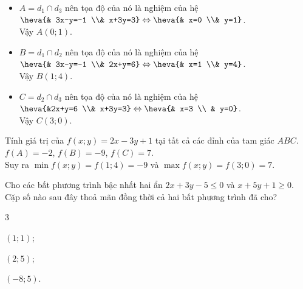\begin{bt}
{	\begin{itemize}
		\item $A=d_1\cap d_3$ nên tọa độ của nó là nghiệm của hệ $\heva{& 3x-y=-1 \\& x+3y=3}\Leftrightarrow \heva{& x=0 \\& y=1}$. \\
		Vậy $A(0;1)$.
		\item $B=d_1\cap d_2$ nên tọa độ của nó là nghiệm của hệ $\heva{& 3x-y=-1 \\& 2x+y=6}\Leftrightarrow \heva{& x=1 \\& y=4}$. \\
		Vậy $B(1;4)$.
		\item $C=d_2\cap d_3$ nên tọa độ của nó là nghiệm của hệ $\heva{&2x+y=6 \\& x+3y=3}\Leftrightarrow \heva{& x=3 \\ & y=0}$. \\
		Vậy $C(3;0)$.
	\end{itemize}
	Tính giá trị của $f(x;y)=2x-3y+1$ tại tất cả các đỉnh của tam giác $ABC$.\\
	$f(A)=-2$, $f(B)=-9$, $f(C)=7$.\\
	Suy ra $\min f( x;y )=f( 1;4 )=-9$ và $\max f( x;y )=f( 3;0 )=7$.
}
\end{bt}

\begin{bt}%
	Cho các bất phương trình bậc nhất hai ẩn $2x+3y-5 \leq 0$ và $x+5y+1 \geq 0$. Cặp số nào sau đây thoả mãn đồng thời cả hai bất phương trình đã cho?
	\begin{enumEX}{3}
		\item $(1;1)$;
		\item $(2;5)$;
		\item $(-8;5)$.
	\end{enumEX}
\end{bt}

